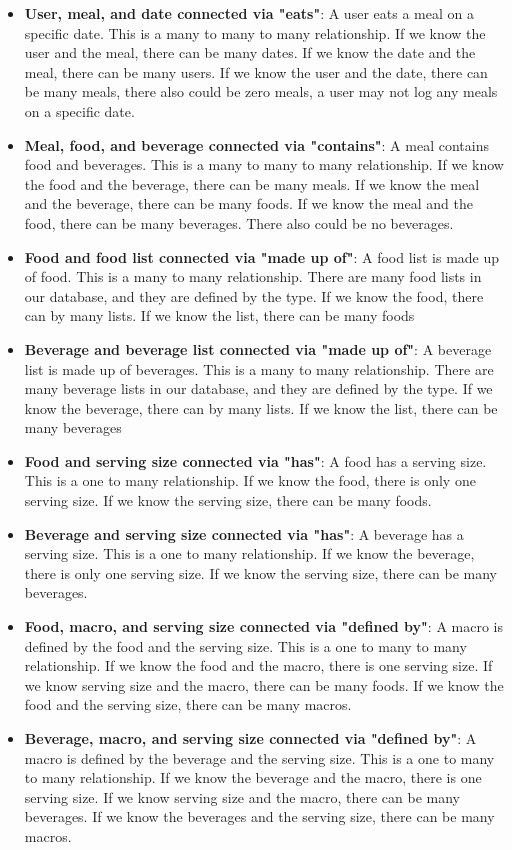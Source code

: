 \documentclass{report}
\begin{document}
\begin{itemize}
        \item \textbf{User, meal, and date connected via "eats"}: A user eats a meal on a specific date. This is a many to many to many relationship. If we know the user and the meal, there can be many dates. If we know the date and the meal, there can be many users. If we know the user and the date, there can be many meals, there also could be zero meals, a user may not log any meals on a specific date.
        \item \textbf{Meal, food, and beverage connected via "contains"}: A meal contains food and beverages. This is a many to many to many relationship. If we know the food and the beverage, there can be many meals. If we know the meal and the beverage, there can be many foods. If we know the meal and the food, there can be many beverages. There also could be no beverages.
        \item \textbf{Food and food list connected via "made up of"}: A food list is made up of food. This is a many to many relationship. There are many food lists in our database, and they are defined by the type. If we know the food, there can by many lists. If we know the list, there can be many foods
        \item \textbf{Beverage and beverage list connected via "made up of"}: A beverage list is made up of beverages. This is a many to many relationship. There are many beverage lists in our database, and they are defined by the type. If we know the beverage, there can by many lists. If we know the list, there can be many beverages
        \item \textbf{Food and serving size connected via "has"}: A food has a serving size. This is a one to many relationship. If we know the food, there is only one serving size. If we know the serving size, there can be many foods.
        \item \textbf{Beverage and serving size connected via "has"}: A beverage has a serving size. This is a one to many relationship. If we know the beverage, there is only one serving size. If we know the serving size, there can be many beverages.
        \item \textbf{Food, macro, and serving size connected via "defined by"}: A macro is defined by the food and the serving size. This is a one to many to many relationship. If we know the food and the macro, there is one serving size. If we know serving size and the macro, there can be many foods. If we know the food and the serving size, there can be many macros.
        \item \textbf{Beverage, macro, and serving size connected via "defined by"}: A macro is defined by the beverage and the serving size. This is a one to many to many relationship. If we know the beverage and the macro, there is one serving size. If we know serving size and the macro, there can be many beverages. If we know the beverages and the serving size, there can be many macros.

\end{itemize}
\end{document}
